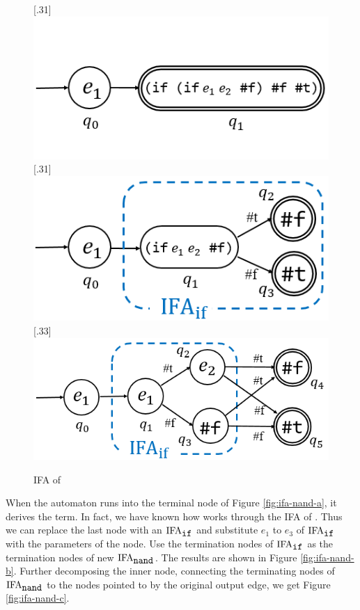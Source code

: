 
\begin{figure}[t]
\centering
{}[.31\linewidth]{
    \includegraphics[scale=0.25]{images/ifa/ifa-nand-1-small.png}
}
[.31\linewidth]{
    \includegraphics[scale=0.25]{images/ifa/ifa-nand-2-small.png}
}
[.33\linewidth]{
    \includegraphics[scale=0.25]{images/ifa/ifa-nand-3-small.png}
}
\caption{IFA of }
\label{fig:ifa-nand}
\end{figure}

When the automaton runs into the terminal node of Figure \ref{fig:ifa-nand-a}, it derives the  term. In fact, we have known how  works through the IFA of . Thus we can replace the last node with an $\text{IFA}_{\mbox{\tt if}}$ and substitute $e_1$ to $e_3$ of $\text{IFA}_{\mbox{\tt if}}$ with the parameters of the node. Use the termination nodes of $\text{IFA}_{\mbox{\tt if}}$ as the termination nodes of new $\text{IFA}_{\mbox{\tt nand}}$. The results are shown in Figure \ref{fig:ifa-nand-b}. Further decomposing the inner  node, connecting the terminating nodes of $\text{IFA}_{\mbox{\tt nand}}$ to the nodes pointed to by the original output edge, we get Figure \ref{fig:ifa-nand-c}. 

